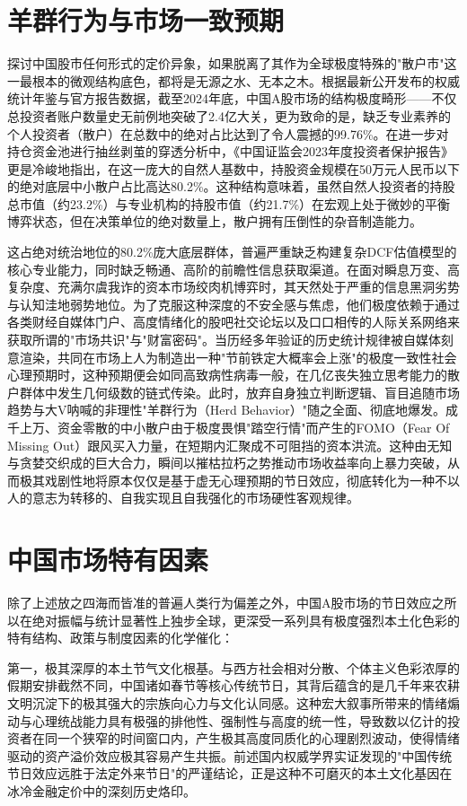 \documentclass{cupb-thesis}
\begin{document}
{\section{羊群行为与市场一致预期}


探讨中国股市任何形式的定价异象，如果脱离了其作为全球极度特殊的"散户市"这一最根本的微观结构底色，都将是无源之水、无本之木。根据最新公开发布的权威统计年鉴与官方报告数据，截至2024年底，中国A股市场的结构极度畸形——不仅总投资者账户数量史无前例地突破了2.4亿大关，更为致命的是，缺乏专业素养的个人投资者（散户）在总数中的绝对占比达到了令人震撼的99.76\%。在进一步对持仓资金池进行抽丝剥茧的穿透分析中，《中国证监会2023年度投资者保护报告》更是冷峻地指出，在这一庞大的自然人基数中，持股资金规模在50万元人民币以下的绝对底层中小散户占比高达80.2\%。这种结构意味着，虽然自然人投资者的持股总市值（约23.2\%）与专业机构的持股市值（约21.7\%）在宏观上处于微妙的平衡博弈状态，但在决策单位的绝对数量上，散户拥有压倒性的杂音制造能力。


这占绝对统治地位的80.2\%庞大底层群体，普遍严重缺乏构建复杂DCF估值模型的核心专业能力，同时缺乏畅通、高阶的前瞻性信息获取渠道。在面对瞬息万变、高复杂度、充满尔虞我诈的资本市场绞肉机博弈时，其天然处于严重的信息黑洞劣势与认知洼地弱势地位。为了克服这种深度的不安全感与焦虑，他们极度依赖于通过各类财经自媒体门户、高度情绪化的股吧社交论坛以及口口相传的人际关系网络来获取所谓的"市场共识"与"财富密码"。当历经多年验证的历史统计规律被自媒体刻意渲染，共同在市场上人为制造出一种"节前铁定大概率会上涨"的极度一致性社会心理预期时，这种预期便会如同高致病性病毒一般，在几亿丧失独立思考能力的散户群体中发生几何级数的链式传染。此时，放弃自身独立判断逻辑、盲目追随市场趋势与大V呐喊的非理性"羊群行为（Herd Behavior）"随之全面、彻底地爆发。成千上万、资金零散的中小散户由于极度畏惧"踏空行情"而产生的FOMO（Fear Of Missing Out）跟风买入力量，在短期内汇聚成不可阻挡的资本洪流。这种由无知与贪婪交织成的巨大合力，瞬间以摧枯拉朽之势推动市场收益率向上暴力突破，从而极其戏剧性地将原本仅仅是基于虚无心理预期的节日效应，彻底转化为一种不以人的意志为转移的、自我实现且自我强化的市场硬性客观规律。


\section{中国市场特有因素}


除了上述放之四海而皆准的普遍人类行为偏差之外，中国A股市场的节日效应之所以在绝对振幅与统计显著性上独步全球，更深受一系列具有极度强烈本土化色彩的特有结构、政策与制度因素的化学催化：


第一，极其深厚的本土节气文化根基。与西方社会相对分散、个体主义色彩浓厚的假期安排截然不同，中国诸如春节等核心传统节日，其背后蕴含的是几千年来农耕文明沉淀下的极其强大的宗族向心力与文化认同感。这种宏大叙事所带来的情绪煽动与心理统战能力具有极强的排他性、强制性与高度的统一性，导致数以亿计的投资者在同一个狭窄的时间窗口内，产生极其高度同质化的心理剧烈波动，使得情绪驱动的资产溢价效应极其容易产生共振。前述国内权威学界实证发现的"中国传统节日效应远胜于法定外来节日"的严谨结论，正是这种不可磨灭的本土文化基因在冰冷金融定价中的深刻历史烙印。


}
\end{document}

